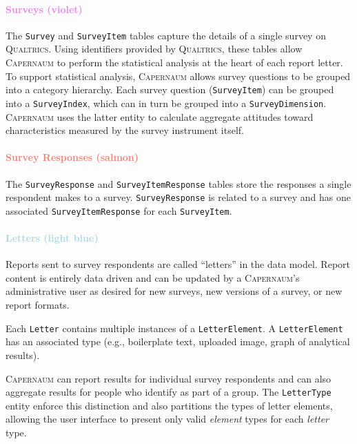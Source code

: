\documentclass{article}
\newcommand{\caper}{\textsc{Capernaum}}
\newcommand{\qual}{\textsc{Qualtrics}}
\begin{document}
\paragraph{\textcolor{Violet}{Surveys (violet)}}

The \texttt{Survey} and \texttt{SurveyItem} tables
capture the details of a single survey on \qual.
Using identifiers provided by \qual,
these tables allow \caper{} to perform the statistical analysis at the heart of each report letter.
To support statistical analysis,
\caper{} allows survey questions to be grouped into a category hierarchy.
Each survey question (\texttt{SurveyItem})
can be grouped into a \texttt{SurveyIndex},
which can in turn be grouped into a \texttt{SurveyDimension}.
\caper{} uses the latter entity to calculate aggregate attitudes
toward characteristics measured by the survey instrument itself.

\paragraph{\textcolor{Salmon}{Survey Responses (salmon)}}

The \texttt{SurveyResponse}
and \texttt{SurveyItemResponse}
tables store the responses a single respondent
makes to a survey.
\texttt{SurveyResponse} is related to a survey
and has one associated \texttt{SurveyItemResponse}
for each \texttt{SurveyItem}.

\paragraph{\textcolor{LightBlue}{Letters (light blue)}}

Reports sent to survey respondents are called ``letters'' in the data model.
Report content is entirely data driven and can be updated by a \caper's administrative user
as desired for new surveys, new versions of a survey, or new report formats.

Each \texttt{Letter} contains multiple
instances of a \texttt{LetterElement}.
A \texttt{LetterElement} has an associated type
(e.g., boilerplate text,
uploaded image,
graph of analytical results).

\caper{} can report results for individual survey respondents
and can also aggregate results for people who identify as part of a group.
The \texttt{LetterType} entity enforce this distinction
and also partitions the types of letter elements,
allowing the user interface to present only valid \emph{element} types
for each \emph{letter} type.
\end{document}
